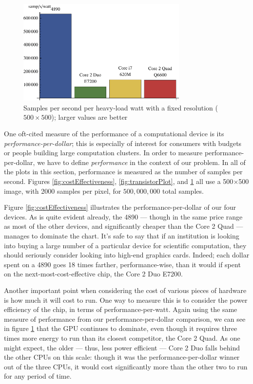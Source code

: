 \documentclass{acmsiggraph}
\begin{document}
\begin{figure}
    \includegraphics[width=84.5mm]{wattPlot.pdf}
    \caption{Samples per second per heavy-load watt with a fixed resolution ($500\times500$); larger values are better}
    \label{fig:wattPlot}
\end{figure}

One oft-cited measure of the performance of a computational device is its {\it performance-per-dollar}; this is especially of interest for consumers with budgets or people building large computation clusters. In order to measure performance-per-dollar, we have to define {\it performance} in the context of our problem. In all of the plots in this section, performance is measured as the number of samples per second. Figures \ref{fig:costEffectiveness}, \ref{fig:transistorPlot}, and \ref{fig:wattPlot} all use a 500$\times$500 image, with 2000 samples per pixel, for $500,000,000$ total samples.

Figure \ref{fig:costEffectiveness} illustrates the performance-per-dollar of our four devices. As is quite evident already, the 4890 --- though in the same price range as most of the other devices, and significantly cheaper than the Core 2 Quad --- manages to dominate the chart. It's safe to say that if an institution is looking into buying a large number of a particular device for scientific computation, they should seriously consider looking into high-end graphics cards. Indeed; each dollar spent on a 4890 goes 18 times farther, performance-wise, than it would if spent on the next-most-cost-effective chip, the Core 2 Duo E7200.

Another important point when considering the cost of various pieces of hardware is how much it will cost to run. One way to measure this is to consider the power efficiency of the chip, in terms of performance-per-watt. Again using the same measure of performance from our performance-per-dollar comparison, we can see in figure \ref{fig:wattPlot} that the GPU continues to dominate, even though it requires three times more energy to run than its closest competitor, the Core 2 Quad. As one might expect, the older --- thus, less power efficient --- Core 2 Duo falls behind the other CPUs on this scale: though it was the performance-per-dollar winner out of the three CPUs, it would cost significantly more than the other two to run for any period of time.
\end{document}

